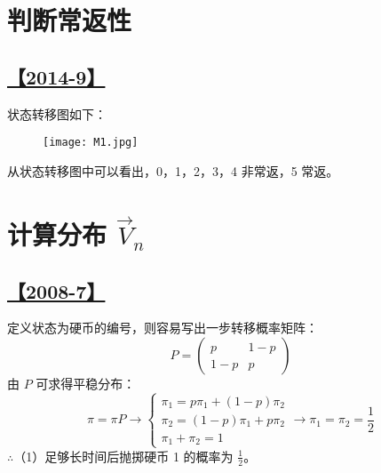 \section{判断常返性}

\subsection{\hyperref[Q2014-9]{【2014-9】}}\label{A2014-9}

状态转移图如下：
\begin{figure}[!htp]
\centering
\texttt{[image: M1.jpg]}
\end{figure}
从状态转移图中可以看出，0，1，2，3，4 非常返，5 常返。

\section{计算分布 $\vec V_n$}

\subsection{\hyperref[Q2008-7]{【2008-7】}}\label{A2008-7}

定义状态为硬币的编号，则容易写出一步转移概率矩阵：
$$
P=
\left(\begin{matrix}
p & 1-p \\ 1-p & p
\end{matrix}\right)
$$
由 $P$ 可求得平稳分布：
$$
\pi=\pi P\rightarrow
\begin{cases}
\pi_1=p\pi_1 + (1-p)\pi_2\\
\pi_{2}=(1-p)\pi_1 + p\pi_{2}\\
\pi_1+\pi_{2}=1
\end{cases}
\rightarrow\pi_1=\pi_2=\frac{1}{2}
$$
$\therefore$（1）足够长时间后抛掷硬币 1 的概率为 $\frac{1}{2}$。

